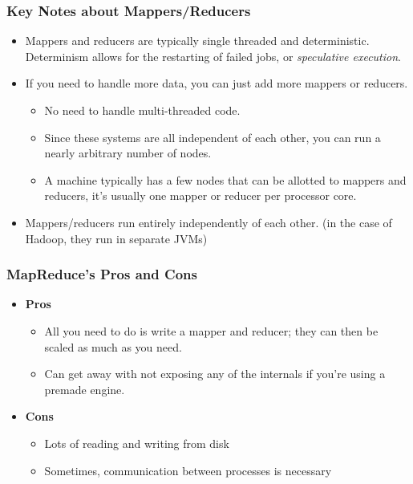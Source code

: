 \documentclass[english, 10pt]{article}
\begin{document}
\subsubsection{Key Notes about Mappers/Reducers}

\begin{itemize}
	\item Mappers and reducers are typically single threaded and deterministic. Determinism allows for the restarting of failed jobs, or \textit{speculative execution}.
	\item If you need to handle more data, you can just add more mappers or reducers.
	\begin{itemize}
		\item No need to handle multi-threaded code.
		\item Since these systems are all independent of each other, you can run a nearly arbitrary number of nodes.
		\item A machine typically has a few nodes that can be allotted to mappers and reducers, it's usually one mapper or reducer per processor core.
	\end{itemize}
	\item Mappers/reducers run entirely independently of each other. (in the case of Hadoop, they run in separate JVMs)
\end{itemize}

\subsubsection{MapReduce's Pros and Cons}

\begin{itemize}
	\item \textbf{Pros}
	\begin{itemize}
		\item All you need to do is write a mapper and reducer; they can then be scaled as much as you need.
		\item Can get away with not exposing any of the internals if you're using a premade engine.
	\end{itemize}
	\item \textbf{Cons}
	\begin{itemize}
		\item Lots of reading and writing from disk
		\item Sometimes, communication between processes is necessary
	\end{itemize}
\end{itemize}
\end{document}
